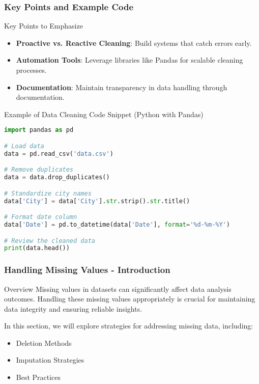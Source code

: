 \documentclass[aspectratio=169]{beamer}
\begin{document}
\begin{frame}[fragile]
    \frametitle{Key Points and Example Code}
    
    \begin{block}{Key Points to Emphasize}
        \begin{itemize}
            \item \textbf{Proactive vs. Reactive Cleaning}: Build systems that catch errors early.
            \item \textbf{Automation Tools}: Leverage libraries like Pandas for scalable cleaning processes.
            \item \textbf{Documentation}: Maintain transparency in data handling through documentation.
        \end{itemize}
    \end{block}
    
    \begin{block}{Example of Data Cleaning Code Snippet (Python with Pandas)}
        \begin{lstlisting}[language=Python]
import pandas as pd

# Load data
data = pd.read_csv('data.csv')

# Remove duplicates
data = data.drop_duplicates()

# Standardize city names
data['City'] = data['City'].str.strip().str.title()

# Format date column
data['Date'] = pd.to_datetime(data['Date'], format='%d-%m-%Y')

# Review the cleaned data
print(data.head())
        \end{lstlisting}
    \end{block}
\end{frame}

\begin{frame}[fragile]
    \frametitle{Handling Missing Values - Introduction}
    \begin{block}{Overview}
        Missing values in datasets can significantly affect data analysis outcomes. Handling these missing values appropriately is crucial for maintaining data integrity and ensuring reliable insights.
    \end{block}
    In this section, we will explore strategies for addressing missing data, including:
    \begin{itemize}
        \item Deletion Methods
        \item Imputation Strategies
        \item Best Practices
    \end{itemize}
\end{frame}
\end{document}
